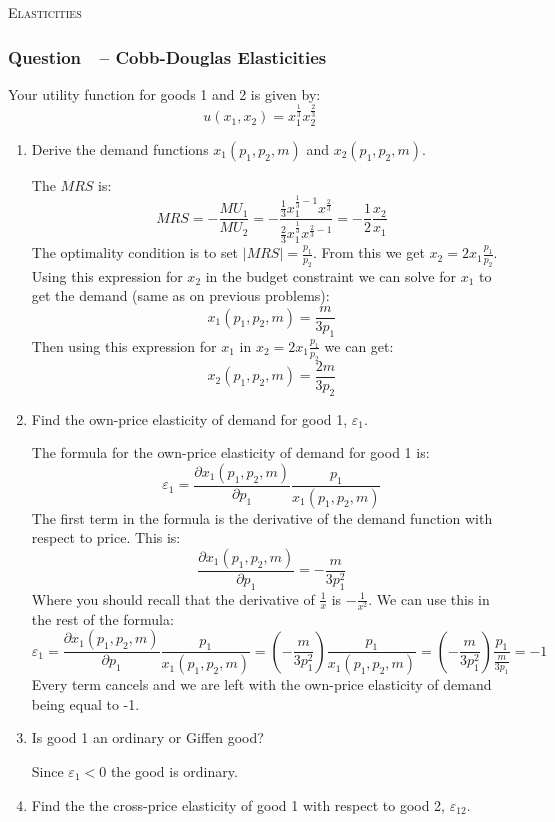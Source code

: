 \documentclass[12pt]{article}
\newcommand{\topic}[1]{\medskip\begin{center}\large\textsc{#1}\normalsize
  \end{center}}
\newcounter{question}[section]
\newcommand{\question}[1]{\refstepcounter{question}
  \subsubsection*{Question~\thequestion~-- #1}}
\newenvironment{subquestions}{
  \begin{enumerate}[label=(\roman*)]}{\end{enumerate}}
\begin{document}
\topic{Elasticities}
\question{Cobb-Douglas Elasticities}
Your utility function for goods 1 and 2 is given by:
\[
  u\left( x_1,x_2 \right)=x_1^{\frac{1}{3}}x_2^{\frac{2}{3}}
\]
\begin{subquestions}
  \item Derive the demand functions $x_1\left( p_1,p_2,m \right)$ and $x_2\left(
    p_1,p_2,m \right)$.

    \textcolor{solution-color}{
      The $MRS$ is:
      \[
        MRS=-\frac{MU_1}{MU_2}=-\frac{\frac{1}{3}x_1^{\frac{1}{3}-1}x^{\frac{2}{3}}}{\frac{2}{3}x_1^{\frac{1}{3}}x^{\frac{2}{3}-1}}=-\frac{1}{2}\frac{x_2}{x_1}
      \]
      The optimality condition is to set $\left| MRS \right|=\frac{p_1}{p_2}$.
      From this we get $x_2=2x_1\frac{p_1}{p_2}$. Using this expression for
    $x_2$ in the budget constraint we can solve for $x_1$ to get the demand
    (same as on previous problems):
      \[
        x_1\left( p_1,p_2,m \right) = \frac{m}{3p_1}
      \]
      Then using this expression for $x_1$ in $x_2=2x_1\frac{p_1}{p_2}$ we can
      get:
      \[
        x_2\left( p_1,p_2,m \right) = \frac{2m}{3p_2}
      \]
    }
  \item Find the own-price elasticity of demand for good 1, $\varepsilon_1$.

    \textcolor{solution-color}{
      The formula for the own-price elasticity of demand for good 1 is:
    \[
      \varepsilon_1=\frac{\partial x_1\left( p_1,p_2,m \right)}{\partial p_1}
      \frac{p_1}{x_1\left( p_1,p_2,m
      \right)}
    \]
    The first term in the formula is the derivative of the demand function with respect to price. This is:
    \[
      \frac{\partial x_1\left( p_1,p_2,m \right)}{\partial p_1}
      = -\frac{m}{3p_1^2}
    \]
    Where you should recall that the derivative of $\frac{1}{x}$ is $-\frac{1}{x^2}$. We can use this in the rest of the formula:
  \[
      \varepsilon_1=\frac{\partial x_1\left( p_1,p_2,m \right)}{\partial p_1}
      \frac{p_1}{x_1\left( p_1,p_2,m
      \right)}=\left(-\frac{m}{3p_1^2}\right)\frac{p_1}{x_1\left( p_1,p_2,m \right)} = \left(-\frac{m}{3p_1^2}\right)\frac{p_1}{\frac{m}{3p_1}}=-1
    \]
    Every term cancels and we are left with the own-price elasticity of demand  being equal to -1.
  }
  \item Is good 1 an ordinary or Giffen good?

    \textcolor{solution-color}{
      Since $\varepsilon_1<0$ the good is ordinary.
  }
  \item Find the the cross-price elasticity of good 1 with respect to good 2,
    $\varepsilon_{12}$.


\end{subquestions}
\end{document}
